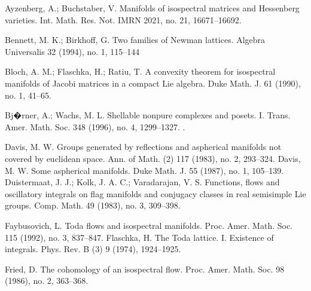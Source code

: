 \documentclass[reqno]{amsart}
\begin{document}
\begin{thebibliography}{}


 Ayzenberg, A.; Buchstaber, V. Manifolds of isospectral matrices and Hessenberg varieties. Int. Math. Res. Not. IMRN 2021, no. 21, 16671--16692.

Bennett, M. K.; Birkhoff, G. Two families of Newman lattices. Algebra Universalis 32 (1994), no. 1, 115--144

 Bloch, A. M.; Flaschka, H.; Ratiu, T. A convexity theorem for isospectral manifolds of Jacobi matrices in a compact Lie algebra. Duke Math. J. 61 (1990), no. 1, 41--65.

Bj�rner, A.; Wachs, M. L. Shellable nonpure complexes and posets. I. Trans. Amer. Math. Soc. 348 (1996), no. 4, 1299--1327.
.


 Davis, M. W. Groups generated by reflections and aspherical manifolds not covered by euclidean space. Ann. of Math. (2) 117 (1983), no. 2, 293--324.
 Davis, M. W. Some aspherical manifolds. Duke Math. J. 55 (1987), no. 1, 105--139.
%
 Duistermaat, J. J.; Kolk, J. A. C.; Varadarajan, V. S. Functions, flows and oscillatory integrals on flag manifolds and conjugacy classes in real semisimple Lie groups. Comp. Math. 49 (1983), no. 3, 309--398.

 Faybusovich, L. Toda flows and isospectral manifolds. Proc. Amer. Math. Soc. 115 (1992), no. 3, 837--847.
 Flaschka, H. The Toda lattice. I. Existence of integrals. Phys. Rev. B (3) 9 (1974), 1924--1925.

 Fried, D. The cohomology of an isospectral flow. Proc. Amer. Math. Soc. 98 (1986), no. 2, 363--368.


\end{thebibliography}
\end{document}
